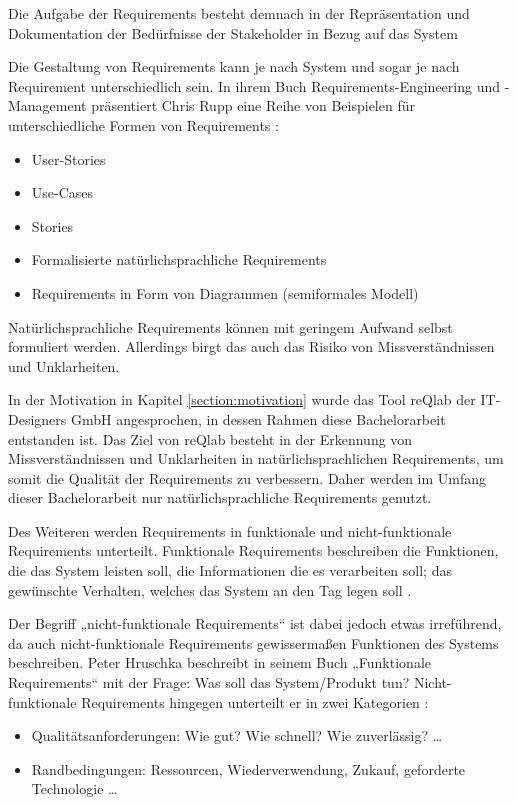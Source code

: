     Die Aufgabe der Requirements besteht demnach in der Repräsentation und Dokumentation der Bedürfnisse der Stakeholder in Bezug auf das System

    \newpage

    Die Gestaltung von Requirements kann je nach System und sogar je nach Requirement unterschiedlich sein.
    In ihrem Buch \glqq{}Requirements-Engineering und -Management\grqq{} präsentiert Chris Rupp eine Reihe von Beispielen für unterschiedliche Formen von Requirements \autocite[][S. 19]{Rupp2014}:
    \begin{itemize}
        \item User-Stories
        \item Use-Cases
        \item Stories
        \item Formalisierte natürlichsprachliche Requirements
        \item Requirements in Form von Diagrammen (semiformales Modell)
    \end{itemize}

    
    Natürlichsprachliche Requirements können mit geringem Aufwand selbst formuliert werden.
    Allerdings birgt das auch das Risiko von Missverständnissen und Unklarheiten.

    In der Motivation in Kapitel \ref{section:motivation} wurde das Tool reQlab der IT-Designers GmbH angesprochen, in dessen Rahmen diese Bachelorarbeit entstanden ist.
    Das Ziel von reQlab besteht in der Erkennung von Missverständnissen und Unklarheiten in natürlichsprachlichen Requirements, um somit die Qualität der Requirements zu verbessern.
    Daher werden im Umfang dieser Bachelorarbeit nur natürlichsprachliche Requirements genutzt.

    Des Weiteren werden Requirements in funktionale und nicht-funktionale Requirements unterteilt.
    Funktionale Requirements beschreiben \glqq{}die Funktionen, die das System leisten soll, die Informationen die es verarbeiten soll; das gewünschte Verhalten, welches das System an den Tag legen soll\grqq{} \autocite[][S. 12]{Hruschka2023}.

    Der Begriff „nicht-funktionale Requirements“ ist dabei jedoch etwas irreführend, da auch nicht-funktionale Requirements gewissermaßen Funktionen des Systems beschreiben. \newline
    Peter Hruschka beschreibt in seinem Buch „Funktionale Requirements“ mit der Frage: \glqq{}Was soll das System/Produkt tun?\grqq{}
    Nicht-funktionale Requirements hingegen unterteilt er in zwei Kategorien \autocite[][S. 13]{Hruschka2023}:
    \begin{itemize}
      \item Qualitätsanforderungen: \glqq{}Wie gut? Wie schnell? Wie zuverlässig? \ldots\grqq{}
      \item Randbedingungen: \glqq{}Ressourcen, Wiederverwendung, Zukauf, geforderte Technologie \ldots\grqq{}
    \end{itemize}
    
